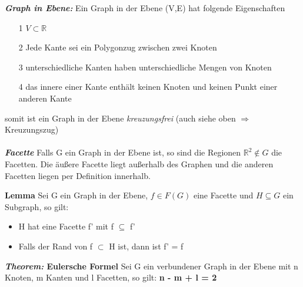 \textbf{\textit{Graph in Ebene:}} \newline
Ein Graph in der Ebene (V,E) hat folgende Eigenschaften
\begin{itemize}
	\item[1] $V \subset \mathbb{R}$
	\item[2] Jede Kante sei ein Polygonzug zwischen zwei Knoten
	\item[3] unterschiedliche Kanten haben unterschiedliche Mengen von Knoten
	\item[4] das innere einer Kante enthält keinen Knoten und keinen Punkt einer anderen Kante 
\end{itemize}
somit ist ein Graph in der Ebene \textit{kreuzungsfrei} (auch siehe oben $\Rightarrow$ Kreuzungszug)
\\\\
\textbf{\textit{Facette}}\newline
Falls G ein Graph in der Ebene ist, so sind die Regionen $\mathbb{R}^2 \notin G$ die Facetten. Die äußere Facette liegt außerhalb des Graphen und die anderen Facetten liegen per Definition innerhalb. \newline

\newpage
\textbf{Lemma} \newline
Sei G ein Graph in der Ebene, $f \in F(G)$ eine Facette und $H \subseteq G$ ein Subgraph, so gilt:
\begin{itemize}
	\item H hat eine Facette f' mit f $\subseteq$ f'
	\item Falls der Rand von f $\subset$ H ist, dann ist f' = f
\end{itemize}

\textbf{\textit{Theorem:} Eulersche Formel} \newline
Sei G ein verbundener Graph in der Ebene mit n Knoten, m Kanten und l Facetten, so gilt: \textbf{n - m + l = 2} \newline

